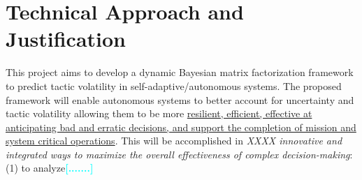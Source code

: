 \documentclass[12pt]{article}
\newcommand{\todo}[1]{\textcolor{cyan}{\textbf{[#1]}}}
\begin{document}
\cfoot{\thepage}
\setcounter{tocdepth}{1} %

\cfoot{} %




\renewcommand\contentsname{Table of Contents}



\tableofcontents
\listoffigures
\listoftables
\newpage

\setcounter{page}{1}


\section{Technical Approach and Justification}

 
This project aims to develop a dynamic Bayesian matrix factorization framework to predict tactic volatility in self-adaptive/autonomous systems. The proposed framework will enable autonomous systems to better account for uncertainty and tactic volatility allowing them to be more \ul{resilient, efficient, effective at anticipating bad and erratic decisions, and support the completion of mission and system critical operations}. This will be accomplished in {\em XXXX innovative and integrated ways to maximize the overall effectiveness of complex decision-making}: (1) to analyze\todo{.......} %
\end{document}
